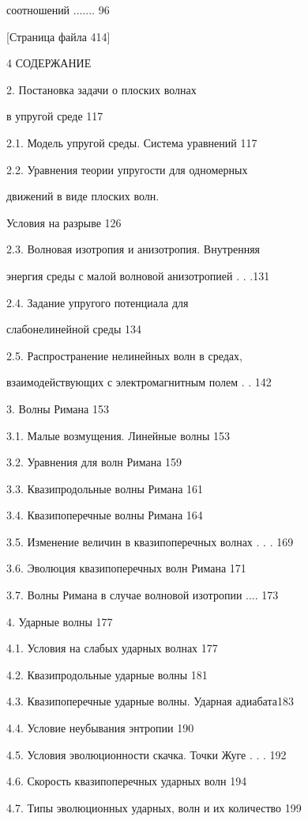 \documentclass[
  11pt,
]{article}
\begin{document}
соотношений .......\textquotesingle{} 96 \par
\smallskip
\smallskip
\smallskip
{[}Страница файла 414{]}\par
4 СОДЕРЖАНИЕ \par
2. Постановка задачи о плоских волнах \par
в упругой среде 117 \par
2.1. Модель упругой среды. Система уравнений 117 \par
2.2. Уравнения теории упругости для одномерных \par
движений в виде плоских волн. \par
Условия на разрыве 126 \par
2.3. Волновая изотропия и анизотропия. Внутренняя \par
энергия среды с малой волновой анизотропией . . .131 \par
2.4. Задание упругого потенциала для \par
слабонелинейной среды 134 \par
2.5. Распространение нелинейных волн в средах, \par
взаимодействующих с электромагнитным полем . . 142 \par
3. Волны Римана 153 \par
3.1. Малые возмущения. Линейные волны 153 \par
3.2. Уравнения для волн Римана 159 \par
3.3. Квазипродольные волны Римана 161 \par
3.4. Квазипоперечные волны Римана 164 \par
3.5. Изменение величин в квазипоперечных волнах . . . 169 \par
3.6. Эволюция квазипоперечных волн Римана 171 \par
3.7. Волны Римана в случае волновой изотропии .... 173 \par
4. Ударные волны 177 \par
4.1. Условия на слабых ударных волнах 177 \par
4.2. Квазипродольные ударные волны 181 \par
4.3. Квазипоперечные ударные волны. Ударная адиабата183 \par
4.4. Условие неубывания энтропии 190 \par
4.5. Условия эволюционности скачка. Точки Жуге . . . 192 \par
4.6. Скорость квазипоперечных ударных волн 194 \par
4.7. Типы эволюционных ударных, волн и их количество 199 \par
\end{document}
